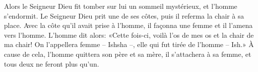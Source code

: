 Alors le Seigneur Dieu fit tomber sur lui un sommeil mystérieux,
	et l’homme s’endormit.
Le Seigneur Dieu prit une de ses côtes, puis il referma la chair à sa place.
Avec la côte qu’il avait prise à l’homme,
	il façonna une femme et il l’amena vers l’homme.
L’homme dit alors:
	«Cette fois-ci, voilà l’os de mes os et la chair de ma chair!
	On l’appellera femme – Ishsha –, elle qui fut tirée de l’homme – Ish.»
À cause de cela, l’homme quittera son père et sa mère,
	il s’attachera à sa femme, et tous deux ne feront plus qu’un.
